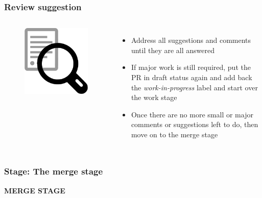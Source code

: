 \documentclass[aspectratio=169]{beamer} %
\begin{document}
\begin{frame}
	\frametitle{Review suggestion}
	\begin{columns}[c]

		\begin{figure}
			\centering
			\includegraphics[width=.6\textwidth]{./img/qa.png}
		\end{figure}

		\begin{itemize}
			\setlength\itemsep{1em}
			\item Address all suggestions and comments
			until they are all answered
			\item If major work is still required,
			put the PR in draft status again and
			add back the \textit{work-in-progress} label and
			start over the work stage
			\item Once there are no more small or major comments
			or suggestions left to do,
			then move on to the merge stage
		\end{itemize}

	\end{columns}
\end{frame}


\begin{frame}
	\frametitle{Stage: The merge stage}

	\huge\centering \textbf{MERGE STAGE}

\end{frame}
\end{document}
